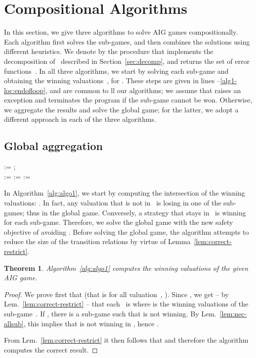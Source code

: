 \documentclass[submission,copyright,creativecommons]{eptcs}
\newtheorem{theorem}{Theorem}
\begin{document}
\section{Compositional Algorithms}\label{sec:algos}
In this section, we give three algorithms to solve AIG games compositionally.
Each algorithm first solves the sub-games, and then combines
the solutions using different heuristics.  We denote by
 the procedure that implements the decomposition of~
described in Section~\ref{sec:decomp}, and returns the set of error
functions~.
In all three algorithms, we start by solving each sub-game and obtaining the
winning valuations~, for .
These steps are given in lines --\ref{alg1-loc:endofloop}, and are common to
ll our algorithms; we assume that \solve{} raises an exception and terminates the
program if the sub-game cannot be won. Otherwise, we aggregate the results and
solve the global game; for the latter, we adopt a different approach in each of
the three algorithms.

\subsection{Global aggregation}

\begin{algorithm}
	\small
	 := ;
	\\
	\For{}
	{
		 := \;
                \label{alg1-loc:endofloop}
	}
	 := \;
	\lFor{}
	{
	   := 
	}
	\label{alg1-loc:beforeret}
	\Return \;
\caption{\texttt{comp\_1}}
\label{alg:algo1}
\end{algorithm}

In Algorithm~\ref{alg:algo1}, we start by computing the intersection of the
winning valuations: . In fact, any
valuation that is not in~ is losing in one of the sub-games; thus in
the global game. Conversely, a strategy that stays in~ is winning for
each sub-game.  Therefore, we solve the global game with the new safety objective of
avoiding .
Before solving the global game, the algorithm attempts to reduce the size of the
transition relations by virtue of Lemma~\ref{lem:correct-restrict}.

\begin{theorem}
  \label{thm:algo1-correct}
  Algorithm~\ref{alg:algo1} computes the winning valuations of the given AIG game.
\end{theorem}	
\begin{proof}
  We prove first that  (that is for all valuation~,
  ). Since , we
  get -- by Lem.~\ref{lem:correct-restrict} -- that
  each~ is  where  is the winning valuations of
  the sub-game~.  If , there is a sub-game
   such that  is not winning.  By Lem.~\ref{lem:nec-allsub}, this
  implies that  is not winning in , hence .

  From Lem.~\ref{lem:correct-restrict} it then follows that
   and therefore the
  algorithm computes the correct result.
\end{proof}
\end{document}

